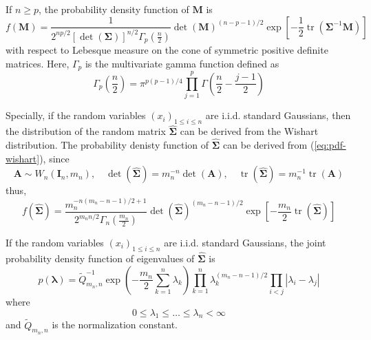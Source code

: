 \begin{theorem}
    If $n\geq p$, the probability density function of $\mathbf{M}$ is
    \begin{equation}
        f\left(\mathbf{M}\right)=\frac{1}{2^{np/2}\left[\operatorname{det}\left(\boldsymbol{\Sigma}\right)\right]^{n/2}\Gamma_{p}\left(\frac{n}{2}\right)}\operatorname{det}\left(\mathbf{M}\right)^{(n-p-1)/2}\exp\left[-\frac{1}{2}\operatorname{tr}\left(\boldsymbol{\Sigma}^{-1}\mathbf{M}\right)\right]
        \label{eq:pdf-wishart}
    \end{equation}
    with respect to Lebesque measure on the cone of symmetric positive definite matrices. Here, $\Gamma_{p}$ is the multivariate gamma function defined as
    \begin{equation*}
        \Gamma_{p}\left(\frac{n}{2}\right)=\pi^{p(p-1)/4}\prod_{j=1}^{p}\Gamma\left(\frac{n}{2}-\frac{j-1}{2}\right)
    \end{equation*}
\end{theorem}

\begin{remark}
    Specially, if the random variables $\left(x_{i}\right)_{1\leq i\leq n}$ are i.i.d. standard Gaussians, then the distribution of the random matrix $\widehat{\boldsymbol{\Sigma}}$ can be derived from the Wishart distribution. The probability denisty function of $\widehat{\boldsymbol{\Sigma}}$ can be derived from (\ref{eq:pdf-wishart}), since
    \begin{equation*}
        \mathbf{A}\sim W_{n}\left(\mathbf{I}_{n},m_{n}\right),\quad\operatorname{det}\left(\widehat{\boldsymbol{\Sigma}}\right)=m_{n}^{-n}\operatorname{det}\left(\mathbf{A}\right),\quad\operatorname{tr}\left(\widehat{\boldsymbol{\Sigma}}\right)=m_{n}^{-1}\operatorname{tr}\left(\mathbf{A}\right)
    \end{equation*}
    thus,
    \begin{equation}
        f\left(\widehat{\boldsymbol{\Sigma}}\right)=\frac{m_{n}^{-n(m_{n}-n-1)/2+1}}{2^{m_{n}n/2}\Gamma_{n}\left(\frac{m_{n}}{2}\right)}\operatorname{det}\left(\widehat{\boldsymbol{\Sigma}}\right)^{(m_{n}-n-1)/2}\exp\left[-\frac{m_{n}}{2}\operatorname{tr}\left(\widehat{\boldsymbol{\Sigma}}\right)\right]
    \end{equation}
\end{remark}

\begin{theorem}
    If the random variables $\left(x_{i}\right)_{1\leq i\leq n}$ are i.i.d. standard Gaussians, the joint probability density function of eigenvalues of $\widehat{\boldsymbol{\Sigma}}$ is
    \begin{equation}
        p\left(\boldsymbol{\lambda}\right)=\widetilde{Q}_{m_{n},n}^{-1}\exp\left(-\frac{m_{n}}{2}\sum_{k=1}^{n}\lambda_{k}\right)\prod_{k=1}^{n}\lambda_{k}^{(m_{n}-n-1)/2}\prod_{i<j}\left|\lambda_{i}-\lambda_{j}\right|
        \label{eq:jpdf-eigenvalues-sigma}
    \end{equation}
    where
    \begin{equation*}
        0\leq\lambda_{1}\leq\ldots\leq\lambda_{n}<\infty
    \end{equation*}
    and $\widetilde{Q}_{m_{n},n}$ is the normalization constant.
\end{theorem}

